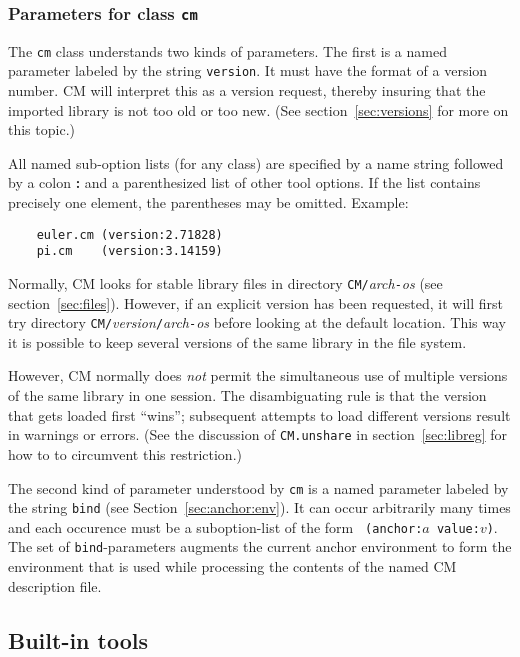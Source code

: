 \documentclass[titlepage,letterpaper]{article}
\begin{document}
\subsubsection*{Parameters for class {\tt cm}}

The {\tt cm} class understands two kinds of parameters.  The first is
a named parameter labeled by the string {\tt version}.  It must have
the format of a version number.  CM will interpret this as a version
request, thereby insuring that the imported library is not too old or
too new. (See section~\ref{sec:versions} for more on this topic.)

All named sub-option lists (for any class) are specified by a name
string followed by a colon {\bf :} and a parenthesized list of other
tool options.  If the list contains precisely one element, the
parentheses may be omitted.  Example:

\begin{verbatim}
    euler.cm (version:2.71828)
    pi.cm    (version:3.14159)
\end{verbatim}

Normally, CM looks for stable library files in directory
{\tt CM/}{\it arch}{\tt -}{\it os} (see section~\ref{sec:files}).
However, if an explicit version has been requested, it will first try
directory {\tt CM/}{\it version}{\tt /}{\it arch}{\tt -}{\it os}
before looking at the default location.  This way it is possible to
keep several versions of the same library in the file system.

However, CM normally does {\em not} permit the simultaneous use of
multiple versions of the same library in one session.  The
disambiguating rule is that the version that gets loaded first
``wins''; subsequent attempts to load different versions result in
warnings or errors.  (See the discussion of {\tt CM.unshare} in
section~\ref{sec:libreg} for how to to circumvent this restriction.)

The second kind of parameter understood by {\tt cm} is a named
parameter labeled by the string {\tt bind} (see
Section~\ref{sec:anchor:env}).  It can occur arbitrarily many times
and each occurence must be a suboption-list of the form {\tt
(anchor:$a$ value:$v$)}.  The set of {\tt bind}-parameters augments
the current anchor environment to form the environment that is used
while processing the contents of the named CM description file.

\subsection{Built-in tools}
\label{sec:builtin-tools}
\end{document}
